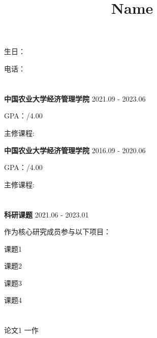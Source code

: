 \documentclass[UTF8,11pt]{ctexart}
\title{\vspace{-3em}Name\vspace{-3em}} %
\author{}
\date{}
\begin{document}

\maketitle


\section{\underline{} } 


\hspace{2em}生日：   

电话：  


\section{\underline{}}

\hspace{2em}\textbf{中国农业大学经济管理学院}  \hfill 2021.09 - 2023.06 

GPA：/4.00 

主修课程: 

\textbf{中国农业大学经济管理学院}  \hfill 2016.09 - 2020.06 

GPA：/4.00 

主修课程: 

\section{\underline{}}

\textbf{科研课题} \tab{}  \hfill 2021.06 - 2023.01

作为核心研究成员参与以下项目：

课题1

课题2

课题3

课题4

\section{\underline{}}

\hspace{2em}论文1 \hfill 一作 
\end{document}
